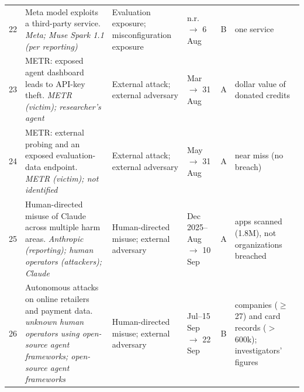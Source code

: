 \begin{tabular}{@{}r R{2.2in} R{1.3in} R{0.9in} c R{1.6in}@{}}
22 & Meta model exploits a third-party service. \textit{Meta; Muse Spark 1.1 (per reporting)} & Evaluation exposure; misconfiguration exposure & n.r. $\to$ 6 Aug & B & one service \\
23 & METR: exposed agent dashboard leads to API-key theft. \textit{METR (victim); researcher's agent} & External attack; external adversary & Mar $\to$ 31 Aug & A & dollar value of donated credits \\
24 & METR: external probing and an exposed evaluation-data endpoint. \textit{METR (victim); not identified} & External attack; external adversary & May $\to$ 31 Aug & A & near miss (no breach) \\
25 & Human-directed misuse of Claude across multiple harm areas. \textit{Anthropic (reporting); human operators (attackers); Claude} & Human-directed misuse; external adversary & Dec 2025--Aug $\to$ 10 Sep & A & apps scanned (1.8M), not organizations breached \\
26 & Autonomous attacks on online retailers and payment data. \textit{unknown human operators using open-source agent frameworks; open-source agent frameworks} & Human-directed misuse; external adversary & Jul--15 Sep $\to$ 22 Sep & B & companies ($\geq$27) and card records ($>$600k); investigators' figures \\
\bottomrule
\end{tabular}
